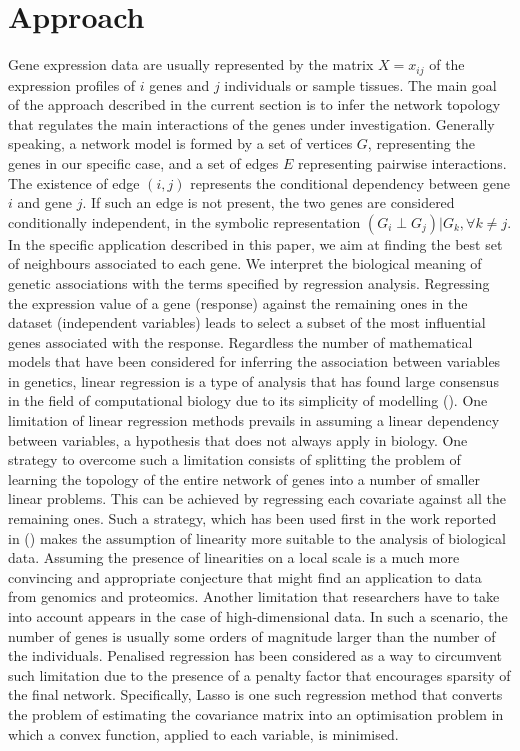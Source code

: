 \section{Approach}\label{approach}
Gene expression data are usually represented by the matrix $X = x_{ij}$ of the expression profiles of $i$ genes and $j$ individuals or sample tissues. 
The main goal of the approach described in the current section is to infer the network topology that regulates the main interactions of the genes under investigation. 
Generally speaking, a network model is formed by a set of vertices $G$, representing the genes in our specific case, and a set of edges $E$ representing pairwise interactions. The existence of edge $(i,j)$ represents the conditional dependency between gene $i$ and gene $j$.  If such an edge is not present, the two genes are considered conditionally independent, in the symbolic representation $(G_i \perp G_j) | G_k, \forall k \neq j$.
In the specific application described in this paper, we aim at finding the best set of neighbours associated to each gene. We interpret the biological meaning of genetic associations with the terms specified by regression analysis. Regressing the expression value of a gene (response) against the remaining ones in the dataset (independent variables) leads to select a subset of the most influential genes associated with the response.
Regardless the number of mathematical models that have been considered for inferring the association between variables in genetics, linear regression is a type of analysis that has found large consensus in the field of computational biology due to its simplicity of modelling (\citealp{linregression2, linregression1}). %
One limitation of linear regression methods prevails in assuming a linear dependency between variables, a hypothesis that does not always apply in biology. One strategy to overcome such a limitation consists of splitting the problem of learning the topology of the entire network of genes into a number of smaller linear problems. This can be achieved by regressing each covariate against all the remaining ones.  Such a strategy, which has been used first in the work reported in (\citealp{Meinshausen06highdimensional}) makes the assumption of linearity more suitable to the analysis of biological data.  Assuming the presence of linearities on a local scale is a much more convincing and appropriate conjecture that might find an application to data from genomics and proteomics.
Another limitation that researchers have to take into account appears in the case of high-dimensional data. In such a scenario, the number of genes is usually some orders of magnitude larger than the number of the individuals. 
Penalised regression has been considered as a way to circumvent such limitation due to the presence of a penalty factor that encourages sparsity of the final network.
Specifically, Lasso is one such regression method that converts the problem of estimating the covariance matrix into an optimisation problem in which a convex function, applied to each variable, is minimised.

